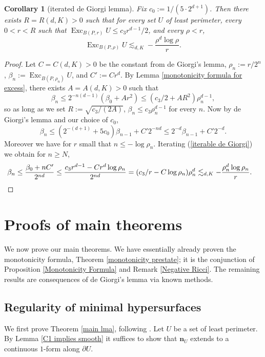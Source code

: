 \documentclass[reqno,10pt]{amsart}
\DeclareMathOperator{\Exc}{Exc}
\newcommand{\normal}{\mathbf n}
\newtheorem{corollary}[theorem]{Corollary}
\theoremstyle{definition}
\numberwithin{equation}{section}
\begin{document}
\begin{corollary}[iterated de Giorgi lemma]\label{iterated de Giorgi}
Fix $c_0 := 1/(5 \cdot 2^{d + 1})$.
Then there exists $R = R(d, K) > 0$ such that for every set $U$ of least perimeter, every $0 < r < R$ such that $\Exc_{B(P, r)} U \leq c_3r^{d - 1}/2$, and every $\rho < r$,
$$\Exc_{B(P, \rho)} U \lesssim_{d, K} -\frac{\rho^d \log \rho}{r}.$$
\end{corollary}
\begin{proof}
Let $C = C(d, K) > 0$ be the constant from de Giorgi's lemma, $\rho_n := r/2^n$, $\beta_n := \Exc_{B(P, \rho_n)} U$, and $C' := Cr^d$.
By Lemma \ref{monotonicity formula for excess}, there exists $A = A(d, K) > 0$ such that
$$\beta_n \leq 2^{-n(d - 1)}(\beta_0 + Ar^2) \leq (c_3/2 + AR^2) \rho_n^{d - 1},$$
so as long as we set $R := \sqrt{c_3/(2A)}$, $\beta_n \leq c_3 \rho_n^{d - 1}$ for every $n$.
Now by de Giorgi's lemma and our choice of $c_0$,
\begin{equation}\label{iterable de Giorgi}
\beta_n \leq (2^{-(d + 1)} + 5c_0) \beta_{n - 1} + C' 2^{-nd} \leq 2^{-d} \beta_{n - 1} + C' 2^{-d}.
\end{equation}
Moreover we have for $r$ small that $n \leq -\log \rho_n$.
Iterating (\ref{iterable de Giorgi}) we obtain for $n \geq N$,
\begin{align*}
    \beta_n &\leq \frac{\beta_0 + nC'}{2^{nd}} \leq \frac{c_3 r^{d - 1} - Cr^d\log \rho_n}{2^{nd}} = (c_3/r - C\log \rho_n)\rho_n^d \lesssim_{d, K} -\frac{\rho_n^d \log \rho_n}{r}. \qedhere 
\end{align*}
\end{proof}



\section{Proofs of main theorems}\label{GornySec}
We now prove our main theorems. We have essentially already proven the monotonicity formula, Theorem \ref{monotonicity prestate}; it is the conjunction of Proposition \ref{Monotonicity Formula} and Remark \ref{Negative Ricci}.
The remaining results are consequences of de Giorgi's lemma via known methods.


\subsection{Regularity of minimal hypersurfaces}
We first prove Theorem \ref{main lma}, following \cite[Chapter 8]{Giusti77}.
Let $U$ be a set of least perimeter.
By Lemma \ref{C1 implies smooth} it suffices to show that $\normal_U$ extends to a continuous $1$-form along $\partial U$.
\end{document}

